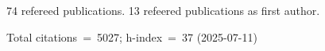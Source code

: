74 refereed publications. 13 refeered publications as first author.

Total citations~=~5027; h-index~=~37 (2025-07-11)